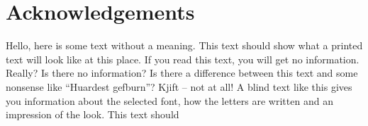 \documentclass[long, final]{jobim2017}
\begin{document}
\section*{Acknowledgements}

Hello, here is some text without a meaning. This text should show what a printed text will look like at this
place. If you read this text, you will get no information. Really? Is there no information? Is there a difference
between this text and some nonsense like “Huardest gefburn”? Kjift – not at all! A blind text like this gives
you information about the selected font, how the letters are written and an impression of the look.
This text should


\end{document}
